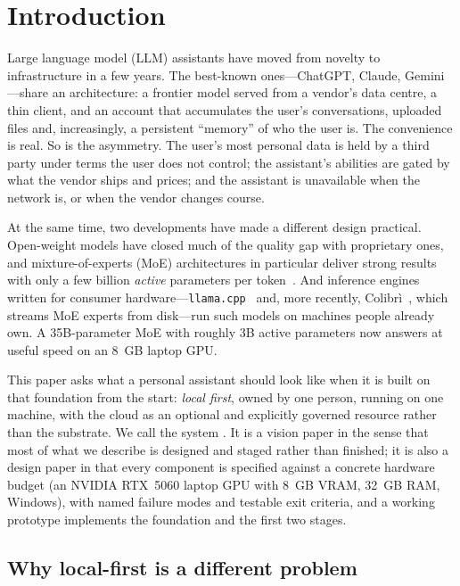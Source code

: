 \section{Introduction}
\label{sec:intro}

Large language model (LLM) assistants have moved from novelty to infrastructure in a few years. The best-known ones---ChatGPT, Claude, Gemini---share an architecture: a frontier model served from a vendor's data centre, a thin client, and an account that accumulates the user's conversations, uploaded files and, increasingly, a persistent ``memory'' of who the user is. The convenience is real. So is the asymmetry. The user's most personal data is held by a third party under terms the user does not control; the assistant's abilities are gated by what the vendor ships and prices; and the assistant is unavailable when the network is, or when the vendor changes course.

At the same time, two developments have made a different design practical. Open-weight models have closed much of the quality gap with proprietary ones, and mixture-of-experts (MoE) architectures in particular deliver strong results with only a few billion \emph{active} parameters per token~\cite{qwen3,gptoss}. And inference engines written for consumer hardware---\texttt{llama.cpp}~\cite{llamacpp} and, more recently, Colibr\`i~\cite{colibri}, which streams MoE experts from disk---run such models on machines people already own. A 35B-parameter MoE with roughly 3B active parameters now answers at useful speed on an 8~GB laptop GPU.

This paper asks what a personal assistant should look like when it is built on that foundation from the start: \emph{local first}, owned by one person, running on one machine, with the cloud as an optional and explicitly governed resource rather than the substrate. We call the system \hivi{}. It is a vision paper in the sense that most of what we describe is designed and staged rather than finished; it is also a design paper in that every component is specified against a concrete hardware budget (an NVIDIA RTX~5060 laptop GPU with 8~GB VRAM, 32~GB RAM, Windows), with named failure modes and testable exit criteria, and a working prototype implements the foundation and the first two stages.

\subsection{Why local-first is a different problem}


